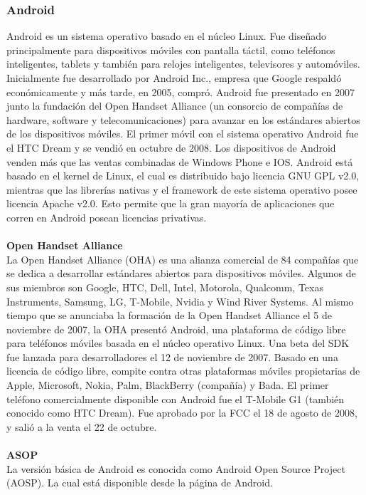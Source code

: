 \subsubsection{Android}
Android es un sistema operativo basado en el núcleo Linux. Fue diseñado principalmente para dispositivos móviles con pantalla táctil, como teléfonos inteligentes, tablets y también para relojes inteligentes, televisores y automóviles. 
Inicialmente fue desarrollado por Android Inc., empresa que Google respaldó económicamente y más tarde, en 2005, compró. Android fue presentado en 2007 junto la fundación del Open Handset Alliance (un consorcio de compañías de hardware, software y telecomunicaciones) para avanzar en los estándares abiertos de los dispositivos móviles. El primer móvil con el sistema operativo Android fue el HTC Dream y se vendió en octubre de 2008. Los dispositivos de Android venden más que las ventas combinadas de Windows Phone e IOS.
Android está basado en el kernel de Linux, el cual es distribuido bajo licencia GNU GPL v2.0, mientras que las librerías nativas y el framework de este sistema operativo posee licencia Apache v2.0. Esto permite que la gran mayoría de aplicaciones que corren en Android posean licencias privativas.
\\
\\
{\bf  Open Handset Alliance}
\\
La Open Handset Alliance (OHA) es una alianza comercial de 84 compañías que se dedica a desarrollar estándares abiertos para dispositivos móviles. Algunos de sus miembros son Google, HTC, Dell, Intel, Motorola, Qualcomm, Texas Instruments, Samsung, LG, T-Mobile, Nvidia y Wind River Systems.
Al mismo tiempo que se anunciaba la formación de la Open Handset Alliance el 5 de noviembre de 2007, la OHA presentó Android, una plataforma de código libre para teléfonos móviles basada en el núcleo operativo Linux. Una beta del SDK fue lanzada para desarrolladores el 12 de noviembre de 2007. Basado en una licencia de código libre, compite contra otras plataformas móviles propietarias de Apple, Microsoft, Nokia, Palm, BlackBerry (compañía) y Bada.
El primer teléfono comercialmente disponible con Android fue el T-Mobile G1 (también conocido como HTC Dream). Fue aprobado por la FCC el 18 de agosto de 2008, y salió a la venta el 22 de octubre.
\\
\\
{\bf ASOP}
\\
La versión básica de Android es conocida como Android Open Source Project (AOSP). La cual está disponible desde la página de Android.
